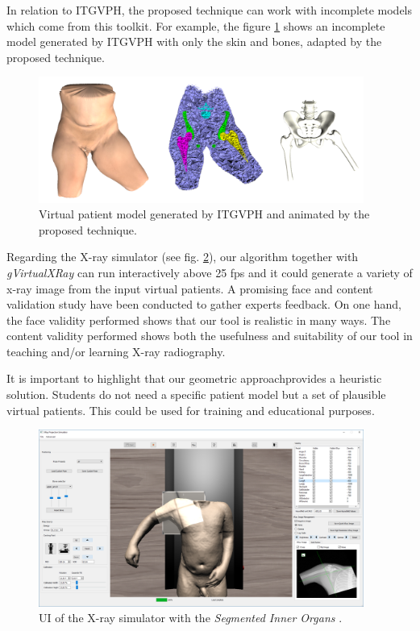 In relation to ITGVPH, the proposed technique can work with incomplete models which come from this toolkit. For example, the figure \ref{fig:summarypatient} shows an incomplete model generated by ITGVPH with only the skin and bones, adapted by the proposed technique.
\begin{figure}[htbp]
    \centering
    \includegraphics[width=0.95\textwidth]{IMG/spatient.png}
    \caption{Virtual patient model generated by ITGVPH and animated by the proposed technique.}
    \label{fig:summarypatient}
\end{figure}

Regarding the X-ray simulator (see fig. \ref{fig:summaryxray}), our algorithm together with \emph{gVirtualXRay} can run interactively above 25 fps and it could generate a variety of x-ray image from the input virtual patients. A promising face and content validation study have been conducted to gather  experts feedback. On one hand, the face validity performed shows that our tool is realistic in many ways.
The content validity performed shows both the usefulness and suitability of our tool in teaching and/or learning X-ray radiography. 



It is important to highlight that our geometric approachprovides a heuristic solution. Students do not need a specific patient model but a set of plausible virtual patients. This could be used for training and educational purposes.

\begin{figure}[htbp]
    \centering
    \includegraphics[width=0.95\textwidth]{IMG/suiteacher.png}
    \caption{UI of the X-ray simulator with the \emph{Segmented Inner Organs} \cite{VoxelMan}.}
    \label{fig:summaryxray}
\end{figure}

